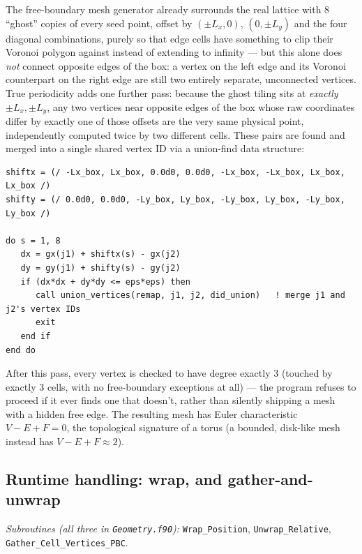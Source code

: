 \documentclass[11pt]{article}
\begin{document}
The free-boundary mesh generator already surrounds the real lattice with 8 ``ghost''
copies of every seed point, offset by $(\pm L_x,0)$, $(0,\pm L_y)$ and the four diagonal
combinations, purely so that edge cells have something to clip their Voronoi polygon
against instead of extending to infinity --- but this alone does \emph{not} connect
opposite edges of the box: a vertex on the left edge and its Voronoi counterpart on the
right edge are still two entirely separate, unconnected vertices. True periodicity adds
one further pass: because the ghost tiling sits at \emph{exactly} $\pm L_x,\pm L_y$, any
two vertices near opposite edges of the box whose raw coordinates differ by exactly one
of those offsets are the very same physical point, independently computed twice by two
different cells. These pairs are found and merged into a single shared vertex ID via a
union-find data structure:
\begin{lstlisting}[caption={The core periodic-identification test (from
\texttt{Generate\_Initial\_Mesh.f90}): two candidate vertices are the same physical
point, seen from opposite sides of the box, if some one of the 8 lattice-period
shifts brings them within numerical tolerance of each other.}]
shiftx = (/ -Lx_box, Lx_box, 0.0d0, 0.0d0, -Lx_box, -Lx_box, Lx_box, Lx_box /)
shifty = (/ 0.0d0, 0.0d0, -Ly_box, Ly_box, -Ly_box, Ly_box, -Ly_box, Ly_box /)

do s = 1, 8
   dx = gx(j1) + shiftx(s) - gx(j2)
   dy = gy(j1) + shifty(s) - gy(j2)
   if (dx*dx + dy*dy <= eps*eps) then
      call union_vertices(remap, j1, j2, did_union)   ! merge j1 and j2's vertex IDs
      exit
   end if
end do
\end{lstlisting}
After this pass, every vertex is checked to have degree exactly 3 (touched by exactly 3
cells, with no free-boundary exceptions at all) --- the program refuses to proceed if
it ever finds one that doesn't, rather than silently shipping a mesh with a hidden free
edge. The resulting mesh has Euler characteristic $V - E + F = 0$, the topological
signature of a torus (a bounded, disk-like mesh instead has $V-E+F\approx 2$).

\subsection{Runtime handling: wrap, and gather-and-unwrap}
\textit{Subroutines (all three in \texttt{Geometry.f90}):}
\texttt{Wrap\_Position},
\texttt{Unwrap\_\allowbreak Relative},
\texttt{Gather\_\allowbreak Cell\_\allowbreak Vertices\_\allowbreak PBC}.
\end{document}
